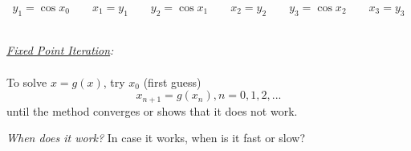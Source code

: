 \documentclass[a4paper,12pt]{report}
\begin{document}
\begin{center}
	$$ y_1 = \cos x_0 \qquad x_1 = y_1 \qquad y_2 = \cos x_1 \qquad x_2 = y_2 \qquad y_3 = \cos x_2 \qquad x_3 = y_3 $$\\
	\bigskip
\fbox
{
	\parbox{0.6\textwidth}
	{
		\noindent \textit{\underline{Fixed Point Iteration}:}\\
		\vspace{-3mm}
		\\
			To solve $x = g(x)$, try $x_0$ (first guess)
			$$x_{n+1} = g(x_n), n = 0, 1, 2, ...$$
			until the method converges or shows that it does not work.
	}
}

\end{center}
	\noindent \textit{When does it work?} In case it works, when is it fast or slow?
	
\end{document}

